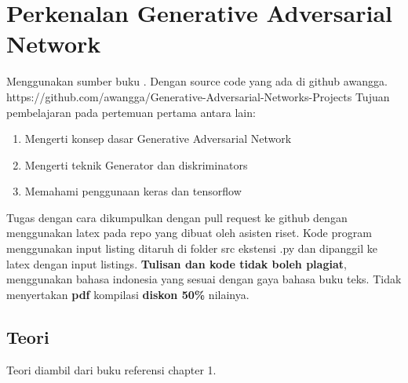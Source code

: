 \chapter{Perkenalan Generative Adversarial Network}
Menggunakan sumber buku \cite{ahirwar2019gan}. Dengan source code yang ada di github awangga. 
https://github.com/awangga/Generative-Adversarial-Networks-Projects
Tujuan pembelajaran pada pertemuan pertama antara lain:
\begin{enumerate}
\item
Mengerti konsep dasar Generative Adversarial Network
\item
Mengerti teknik Generator dan diskriminators
\item
Memahami penggunaan keras dan tensorflow
\end{enumerate}

Tugas dengan cara dikumpulkan dengan pull request ke github dengan menggunakan latex pada repo yang dibuat oleh asisten riset. Kode program menggunakan input listing ditaruh di folder src ekstensi .py dan dipanggil ke latex dengan input listings. \textbf{Tulisan dan kode tidak boleh plagiat}, menggunakan bahasa indonesia yang sesuai dengan gaya bahasa buku teks. Tidak menyertakan \textbf{pdf} kompilasi \textbf{diskon 50\%} nilainya.

\section{Teori}
Teori diambil dari buku referensi \cite{ahirwar2019gan}  chapter 1. 

